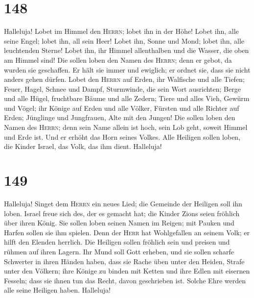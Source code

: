 \hypertarget{section-147}{%
\section{148}\label{section-147}}

 Halleluja! Lobet im Himmel den \textsc{Herrn}; lobet ihn
in der Höhe!  Lobet ihn, alle seine Engel; lobet ihn, all
sein Heer!  Lobet ihn, Sonne und Mond; lobet ihn, alle
leuchtenden Sterne!  Lobet ihn, ihr Himmel allenthalben
und die Wasser, die oben am Himmel sind!  Die sollen loben
den Namen des \textsc{Herrn}; denn er gebot, da wurden sie geschaffen.
 Er hält sie immer und ewiglich; er ordnet sie, dass sie
nicht anders gehen dürfen.  Lobet den \textsc{Herrn} auf
Erden, ihr Walfische und alle Tiefen;  Feuer, Hagel,
Schnee und Dampf, Sturmwinde, die sein Wort ausrichten; 
Berge und alle Hügel, fruchtbare Bäume und alle Zedern; 
Tiere und alles Vieh, Gewürm und Vögel;  ihr Könige auf
Erden und alle Völker, Fürsten und alle Richter auf Erden;
 Jünglinge und Jungfrauen, Alte mit den Jungen!
 Die sollen loben den Namen des \textsc{Herrn}; denn sein
Name allein ist hoch, sein Lob geht, soweit Himmel und Erde ist.
 Und er erhöht das Horn seines Volkes. Alle Heiligen
sollen loben, die Kinder Israel, das Volk, das ihm dient. Halleluja!

\hypertarget{section-148}{%
\section{149}\label{section-148}}

 Halleluja! Singet dem \textsc{Herrn} ein neues Lied; die
Gemeinde der Heiligen soll ihn loben.  Israel freue sich
des, der es gemacht hat; die Kinder Zions seien fröhlich über ihren
König.  Sie sollen loben seinen Namen im Reigen; mit
Pauken und Harfen sollen sie ihm spielen.  Denn der
\textsc{Herr} hat Wohlgefallen an seinem Volk; er hilft den Elenden
herrlich.  Die Heiligen sollen fröhlich sein und preisen
und rühmen auf ihren Lagern.  Ihr Mund soll Gott erheben,
und sie sollen scharfe Schwerter in ihren Händen haben, 
dass sie Rache üben unter den Heiden, Strafe unter den Völkern;
 ihre Könige zu binden mit Ketten und ihre Edlen mit
eisernen Fesseln;  dass sie ihnen tun das Recht, davon
geschrieben ist. Solche Ehre werden alle seine Heiligen haben.
Halleluja!

